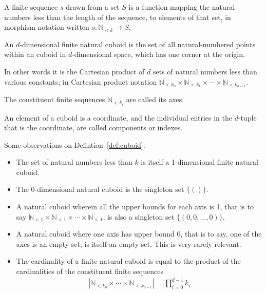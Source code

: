 \documentclass{DIKU-report-variant}
\newcommand\Nat{\mathbb{N}}
\begin{document}
\begin{definition}
  \label{def:finseq}
  A finite sequence \(s\) drawn from a set \(S\) is a function mapping the natural
  numbers less than the length of the sequence, to elements of that set,
  in morphism notation written \(s : \Nat_{<k} \to S\),
\end{definition}

\begin{definition}
  \label{def:cuboid}
  An \(d\)-dimensional finite natural cuboid is the set of all natural-numbered points
  within an cuboid in \(d\)-dimensional space, which has one corner at the origin.

  In other words it is the Cartesian product of \(d\) sets of natural numbers
  less than various constants; in Cartesian product notation
  \(\Nat_{<k_0} \times \Nat_{<k_1} \times \cdots \times \Nat_{<k_{d-1}}\).

  The constituent finite sequences \(\Nat_{<k_i}\) are called its axes.

  An element of a cuboid is a coordinate, and the individual entries in
  the \(d\)-tuple that is the coordinate, are called components or indexes.
\end{definition}
\begin{observation}
  \label{ob:cuboid}
  Some observations on Defintion~\ref{def:cuboid}:
  \begin{itemize}
    \item The set of natural numbers less than \(k\) is itself a 1-dimensional finite natural cuboid.
    \item The 0-dimensional natural cuboid is the singleton set \(\{()\}\).
    \item A natural cuboid wherein all the upper bounds for each axis is 1, that
      is to say \(\Nat_{<1} \times \Nat_{<1} \times \cdots \times \Nat_{<1}\), is
      also a singleton set \(\{(0, 0, \dots, 0)\}\).
    \item A natural cuboid where one axis has upper bound 0, that is to
      say, one of the axes is an empty set; is itself an empty set. This is very rarely relevant.
    \item The cardinality of a finite natural cuboid is equal to the product of
      the cardinalities of the constituent finite sequences
      \begin{align*}
      |\Nat_{<k_0} \times \cdots \times \Nat_{<k_{d-1}}| = \prod_{i=0}^{d-1} k_i
      \end{align*}
  \end{itemize}
\end{observation}
\end{document}
